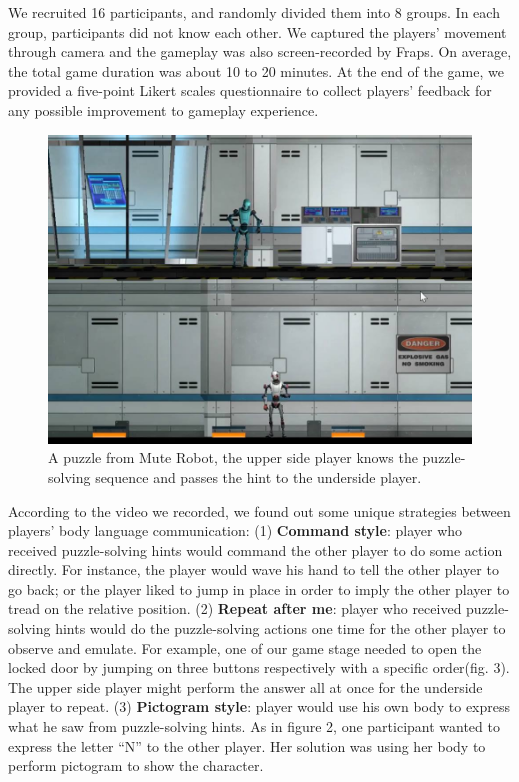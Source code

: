 \documentclass{chi-ext}
\begin{document}
We recruited 16 participants, and randomly divided them into 8 groups. In each group, participants did not know each other. We captured the players' movement through camera and the gameplay was also screen-recorded by Fraps\cite{Fraps}.
On average, the total game duration was about 10 to 20 minutes. 
At the end of the game, we provided a five-point Likert scales questionnaire to 
collect players' feedback for any possible improvement to gameplay experience.

\begin{figure}
  \centering
  \includegraphics[width=0.8\linewidth]{figures/Figure2.jpg}
  \caption{A puzzle from Mute Robot, the upper side player knows the puzzle-solving sequence and passes the hint to the underside player.}
  \label{fig:Figure2}
\end{figure}

According to the video we recorded, we found out some unique strategies between players' body language communication: 
(1) {\bf Command style}: player who received puzzle-solving hints would command the other player to do some action directly. For instance, the player would wave his hand to tell the other player to go back; or the player liked to jump in place in order to imply the other player to tread on the relative position.
(2) {\bf Repeat after me}: player who received puzzle-solving hints would do the puzzle-solving actions one time for the other player to observe and emulate. For example, one of our game stage needed to open the locked door by jumping on three buttons respectively with a specific order(fig. 3). The upper side player might perform the answer all at once for the underside player to repeat.
(3) {\bf Pictogram style}: player would use his own body to express what he saw from puzzle-solving hints. As in figure 2, one participant wanted to express the letter ``N'' to the other player. Her solution was using her body to perform pictogram to show the character.
\end{document}
